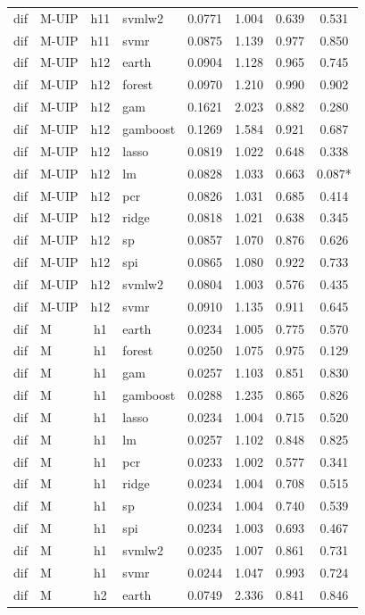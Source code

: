 \begin{ThreePartTable}
\begin{longtable}[t]{llclcccc}
dif & M-UIP & h11 & svmlw2 & 0.0771 & 1.004 & 0.639 & 0.531\\
dif & M-UIP & h11 & svmr & 0.0875 & 1.139 & 0.977 & 0.850\\
\addlinespace
dif & M-UIP & h12 & earth & 0.0904 & 1.128 & 0.965 & 0.745\\
dif & M-UIP & h12 & forest & 0.0970 & 1.210 & 0.990 & 0.902\\
dif & M-UIP & h12 & gam & 0.1621 & 2.023 & 0.882 & 0.280\\
dif & M-UIP & h12 & gamboost & 0.1269 & 1.584 & 0.921 & 0.687\\
dif & M-UIP & h12 & lasso & 0.0819 & 1.022 & 0.648 & 0.338\\
dif & M-UIP & h12 & lm & 0.0828 & 1.033 & 0.663 & 0.087*\\
dif & M-UIP & h12 & pcr & 0.0826 & 1.031 & 0.685 & 0.414\\
dif & M-UIP & h12 & ridge & 0.0818 & 1.021 & 0.638 & 0.345\\
dif & M-UIP & h12 & sp & 0.0857 & 1.070 & 0.876 & 0.626\\
dif & M-UIP & h12 & spi & 0.0865 & 1.080 & 0.922 & 0.733\\
dif & M-UIP & h12 & svmlw2 & 0.0804 & 1.003 & 0.576 & 0.435\\
dif & M-UIP & h12 & svmr & 0.0910 & 1.135 & 0.911 & 0.645\\
\addlinespace
dif & M & h1 & earth & 0.0234 & 1.005 & 0.775 & 0.570\\
dif & M & h1 & forest & 0.0250 & 1.075 & 0.975 & 0.129\\
dif & M & h1 & gam & 0.0257 & 1.103 & 0.851 & 0.830\\
dif & M & h1 & gamboost & 0.0288 & 1.235 & 0.865 & 0.826\\
dif & M & h1 & lasso & 0.0234 & 1.004 & 0.715 & 0.520\\
dif & M & h1 & lm & 0.0257 & 1.102 & 0.848 & 0.825\\
dif & M & h1 & pcr & 0.0233 & 1.002 & 0.577 & 0.341\\
dif & M & h1 & ridge & 0.0234 & 1.004 & 0.708 & 0.515\\
dif & M & h1 & sp & 0.0234 & 1.004 & 0.740 & 0.539\\
dif & M & h1 & spi & 0.0234 & 1.003 & 0.693 & 0.467\\
dif & M & h1 & svmlw2 & 0.0235 & 1.007 & 0.861 & 0.731\\
dif & M & h1 & svmr & 0.0244 & 1.047 & 0.993 & 0.724\\
\addlinespace
dif & M & h2 & earth & 0.0749 & 2.336 & 0.841 & 0.846\\

\end{longtable}
\end{ThreePartTable}
